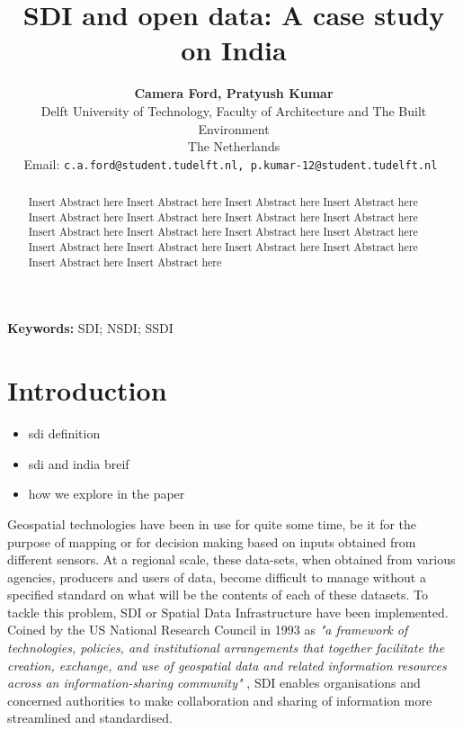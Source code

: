 \documentclass[a4paper]{article}
\begin{document}
\title{\textbf{SDI and open data: A case study on India} }

\author{\small \textbf{Camera Ford, Pratyush Kumar} \\
        \small Delft University of Technology, Faculty of Architecture and The Built Environment \\
        \small The Netherlands\\
        \small Email: \tt{c.a.ford@student.tudelft.nl, p.kumar-12@student.tudelft.nl}
}


\date{}
\maketitle

\begin{abstract}
\noindent Insert Abstract here Insert Abstract here Insert Abstract here Insert Abstract here Insert Abstract here 
Insert Abstract here Insert Abstract here Insert Abstract here Insert Abstract here Insert Abstract here Insert Abstract here Insert Abstract here Insert Abstract here Insert Abstract here Insert Abstract here Insert Abstract here Insert Abstract here Insert Abstract here 
\end{abstract}

\small \textbf{Keywords: } SDI; NSDI; SSDI

\section{Introduction}
\begin{itemize}
    \item sdi definition 
    \item sdi and india breif
    \item how we explore in the paper
\end{itemize}
Geospatial technologies have been in use for quite some time, be it for the purpose of mapping or for decision making based on inputs obtained from different sensors. At a regional scale, these data-sets, when obtained from various agencies, producers and users of data,  become difficult to manage without a specified standard on what will be the contents of each of these datasets. To tackle this problem, SDI or Spatial Data Infrastructure have been implemented. Coined by the US National Research Council in 1993 as \textit{ "a framework of technologies, policies, and institutional arrangements that together facilitate the creation, exchange, and use of geospatial data and related information resources across an information-sharing community"} \cite{council1993toward}, SDI enables organisations and concerned authorities to make collaboration and sharing of information more streamlined and standardised.




\newpage


\end{document}
